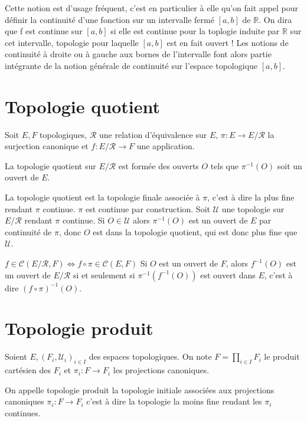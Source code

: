 \documentclass[a4paper, 11pt, french]{book}
\theoremstyle{plain} %
\theoremstyle{definition} %
\theoremstyle{remark} %
\newcommand{\1}{\mathds{1}}
\newcommand{\cont}{\mathcal{C}}
\newcommand{\inv}[1]{#1^{-1}}
\newcommand{\R}{\mathbb{R}}
\begin{document}
\remarque
Cette notion est d’usage fréquent, c’est en particulier à elle qu’on fait appel pour
définir la continuité d’une fonction sur un intervalle fermé $[a, b]$ de $\R$.
On dira que f est continue sur $[a, b]$ si elle est continue pour la toplogie induite par $\R$ sur cet intervalle, topologie pour laquelle $[a, b]$ est en fait ouvert !
Les notions de continuité à droite ou à gauche aux bornes de l’intervalle font alors partie intégrante de la notion générale de continuité sur l’espace topologique $[a, b]$.

\section{Topologie quotient}
Soit $E, F$ topologiques, $\mathcal{R}$ une relation d’équivalence sur $E$, $\pi\colon E\rightarrow E/\mathcal{R}$ la surjection canonique et $f\colon E/\mathcal{R}\rightarrow F$ une application.

La topologie quotient sur $E/\mathcal{R}$ est formée des ouverts $O$ tels que $\inv{\pi}(O)$ soit un ouvert de $E$.

\proposition
La topologie quotient est la topologie finale associée à $\pi$, c'est à dire la plus fine rendant $\pi$ continue.
\demonstration
$\pi$ est continue par construction.
Soit $\mathscr{U}$ une topologie sur $E/\mathcal{R}$ rendant $\pi$ continue.
Si $O\in\mathscr{U}$ alors $\inv{\pi}(O)$ est un ouvert de $E$ par continuité de $\pi$, donc $O$ est dans la topologie quotient, qui est donc plus fine que $\mathscr{U}$.

\proposition
$f\in\cont(E/\mathcal{R}, F)\iff f\circ\pi\in\cont(E, F)$
\demonstration
Si $O$ est un ouvert de $F$, alors $\inv{f}(O)$ est un ouvert de $E/\mathcal{R}$ si et seulement si $\inv{\pi}(\inv{f}(O))$ est ouvert dans $E$, c'est à dire $\inv{(f\circ\pi)}(O)$.

\section{Topologie produit}
Soient $E, (F_i, \mathscr{U}_i)_{i\in I}$ des espaces topologiques.
On note $F=\prod_{i\in I} F_i$ le produit cartésien des $F_i$ et $\pi_i\colon F\rightarrow F_i$ les projections canoniques.

On appelle topologie produit la topologie initiale associées aux projections canoniques $\pi_i\colon F\rightarrow F_i$ c'est à dire la topologie la moins fine rendant les $\pi_i$ continues.
\end{document}
